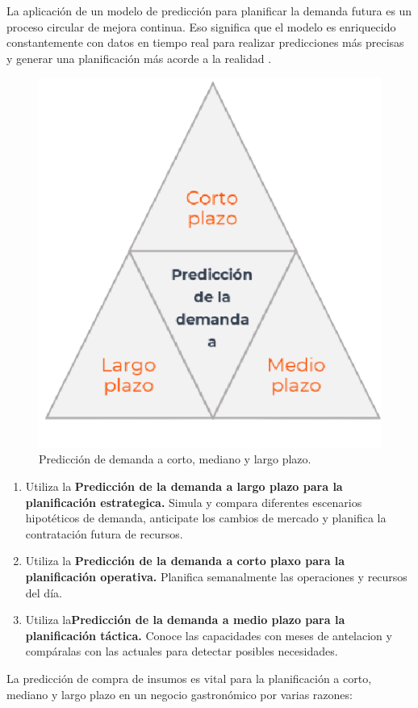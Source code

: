 La aplicación de un modelo de predicción para planificar la demanda futura es un proceso circular de mejora continua. Eso significa que el modelo es enriquecido constantemente con datos en tiempo real para realizar predicciones más precisas y generar una planificación más acorde a la realidad \cite{decide}.
\begin{figure}[H]
  \begin{center}
    \includegraphics[scale=0.70]{./trianguloCMD.png}
    \caption{Predicción de demanda a corto, mediano y largo plazo\cite{decide}.}
    \label{fig:proceso_inventario}
  \end{center}
\end{figure}

\begin{enumerate}
  \item Utiliza la \textbf{Predicción de la demanda a largo plazo para la planificación estrategica.}
  Simula y compara diferentes escenarios hipotéticos de demanda, anticipate los cambios de mercado y planifica la contratación futura de recursos.
  \item Utiliza la \textbf{Predicción de la demanda a corto plaxo para la planificación operativa.}
  Planifica semanalmente las operaciones y recursos del día.
  \item Utiliza la\textbf{Predicción de la demanda a medio plazo para la planificación táctica.} 
  Conoce las capacidades con meses de antelacion y compáralas con las actuales para detectar posibles necesidades.
\end{enumerate}
\vspace{1\baselineskip}
La predicción de compra de insumos es vital para la planificación a corto, mediano y largo plazo en un negocio gastronómico por varias razones:



